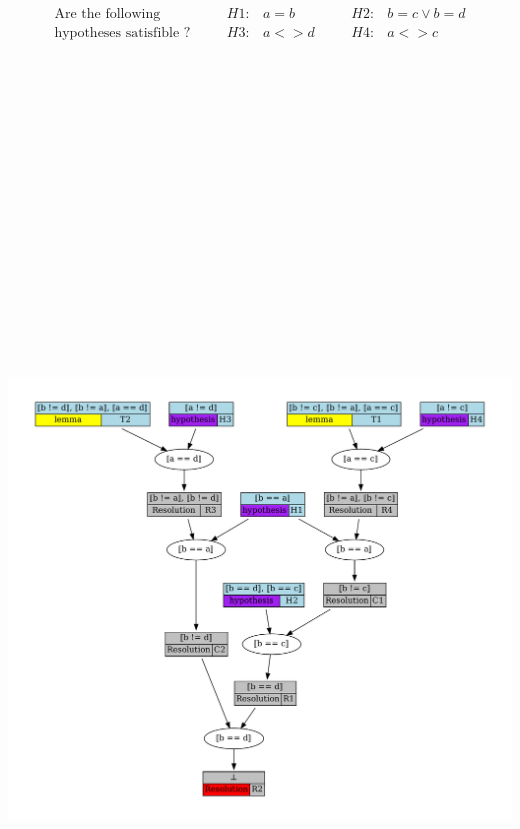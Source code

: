 \documentclass[portrait,a0,final]{a0poster}
\begin{document}
\begin{center}
\begin{multicols}{2}
{
  \vspace{.2cm}
  \[
  \begin{matrix}
    \text{Are the following} & \quad & H1: & a = b   & \quad & H2: & b = c \lor b = d \\
    \text{hypotheses satisfible ?} & \quad & H3: & a <> d  & \quad & H4: & a <> c \\
  \end{matrix}
  \]
  \includegraphics[height=33cm]{proof}
}


\end{multicols}
\end{center}
\end{document}
